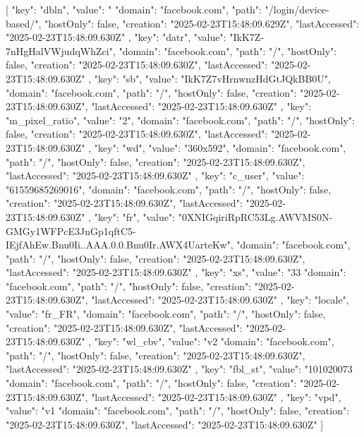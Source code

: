 [
    {
        "key": "dbln",
        "value": "%
        "domain": "facebook.com",
        "path": "/login/device-based/",
        "hostOnly": false,
        "creation": "2025-02-23T15:48:09.629Z",
        "lastAccessed": "2025-02-23T15:48:09.630Z"
    },
    {
        "key": "datr",
        "value": "IkK7Z-7nHgHalVWjudqWhZci",
        "domain": "facebook.com",
        "path": "/",
        "hostOnly": false,
        "creation": "2025-02-23T15:48:09.630Z",
        "lastAccessed": "2025-02-23T15:48:09.630Z"
    },
    {
        "key": "sb",
        "value": "IkK7Z7vHrnwnzHdGtJQkBB0U",
        "domain": "facebook.com",
        "path": "/",
        "hostOnly": false,
        "creation": "2025-02-23T15:48:09.630Z",
        "lastAccessed": "2025-02-23T15:48:09.630Z"
    },
    {
        "key": "m_pixel_ratio",
        "value": "2",
        "domain": "facebook.com",
        "path": "/",
        "hostOnly": false,
        "creation": "2025-02-23T15:48:09.630Z",
        "lastAccessed": "2025-02-23T15:48:09.630Z"
    },
    {
        "key": "wd",
        "value": "360x592",
        "domain": "facebook.com",
        "path": "/",
        "hostOnly": false,
        "creation": "2025-02-23T15:48:09.630Z",
        "lastAccessed": "2025-02-23T15:48:09.630Z"
    },
    {
        "key": "c_user",
        "value": "61559685269016",
        "domain": "facebook.com",
        "path": "/",
        "hostOnly": false,
        "creation": "2025-02-23T15:48:09.630Z",
        "lastAccessed": "2025-02-23T15:48:09.630Z"
    },
    {
        "key": "fr",
        "value": "0XNIGqiriRpRC53Lg.AWVMS0N-GMGy1WFPcE3JnGp1qftC5-IEjfAhEw.Bnu0Ii..AAA.0.0.Bnu0Ir.AWX4UarteKw",
        "domain": "facebook.com",
        "path": "/",
        "hostOnly": false,
        "creation": "2025-02-23T15:48:09.630Z",
        "lastAccessed": "2025-02-23T15:48:09.630Z"
    },
    {
        "key": "xs",
        "value": "33%
        "domain": "facebook.com",
        "path": "/",
        "hostOnly": false,
        "creation": "2025-02-23T15:48:09.630Z",
        "lastAccessed": "2025-02-23T15:48:09.630Z"
    },
    {
        "key": "locale",
        "value": "fr_FR",
        "domain": "facebook.com",
        "path": "/",
        "hostOnly": false,
        "creation": "2025-02-23T15:48:09.630Z",
        "lastAccessed": "2025-02-23T15:48:09.630Z"
    },
    {
        "key": "wl_cbv",
        "value": "v2%
        "domain": "facebook.com",
        "path": "/",
        "hostOnly": false,
        "creation": "2025-02-23T15:48:09.630Z",
        "lastAccessed": "2025-02-23T15:48:09.630Z"
    },
    {
        "key": "fbl_st",
        "value": "101020073%
        "domain": "facebook.com",
        "path": "/",
        "hostOnly": false,
        "creation": "2025-02-23T15:48:09.630Z",
        "lastAccessed": "2025-02-23T15:48:09.630Z"
    },
    {
        "key": "vpd",
        "value": "v1%
        "domain": "facebook.com",
        "path": "/",
        "hostOnly": false,
        "creation": "2025-02-23T15:48:09.630Z",
        "lastAccessed": "2025-02-23T15:48:09.630Z"
    }
]
